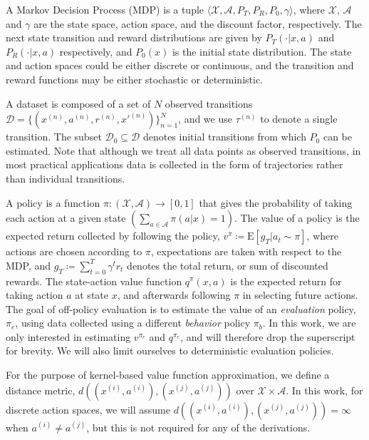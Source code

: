 \documentclass{article}
\begin{document}
A Markov Decision Process (MDP) is a tuple $\langle \mathcal{X}, \mathcal{A}, P_T, P_R, P_0, \gamma \rangle$, where $\mathcal{X}$, $\mathcal{A}$ and $\gamma$ are the state space, action space, and the discount factor, respectively. The next state transition and reward distributions are given by $P_T(\cdot | x, a)$ and $P_R(\cdot | x, a)$ respectively, and $P_0(x)$ is the initial state distribution. The state and action spaces could be either discrete or continuous, and the transition and reward functions may be either stochastic or deterministic. 

A dataset is composed of a set of $N$ observed transitions $\mathcal{D} =  \{ (x^{(n)}, a^{(n)} ,r^{(n)} ,x'^{(n)}) \}_{n=1}^N$, and we use $\tau^{(n)}$ to denote a single transition. The subset $\mathcal{D}_0 \subseteq \mathcal{D}$ denotes initial transitions from which $P_0$ can be estimated. Note that although we treat all data points as observed transitions, in most practical applications data is collected in the form of trajectories rather than individual transitions.

A policy is a function $\pi : (\mathcal{X}, \mathcal{A}) \rightarrow \left[0, 1 \right]$ that gives the probability of taking each action at a given state $(\sum_{a \in \mathcal{A}} \pi(a|x) = 1)$.  The value of a policy is the expected return collected by following the policy, $v^\pi \coloneqq \mathrm{E} [ g_T | a_t \sim \pi]$, where actions are chosen according to $\pi$, expectations are taken with respect to the MDP, and $g_T \coloneqq \sum_{t=0}^T \gamma^t r_t$ denotes the total return, or sum of discounted rewards. The state-action value function $q^{\pi}(x, a)$ is the expected return for taking action $a$ at state $x$, and afterwards following $\pi$ in selecting future actions. The goal of off-policy evaluation is to estimate the value of an \emph{evaluation} policy, $\pi_e$, using data collected using a different \emph{behavior} policy $\pi_b$. In this work, we are only interested in estimating $v^{\pi_e}$ and $q^{\pi_e}$, and will therefore drop the superscript for brevity. We will also limit ourselves to deterministic evaluation policies.

For the purpose of kernel-based value function approximation, we define a distance metric, $d((x^{(i)}, a^{(i)}),(x^{(j)}, a^{(j)}))$ over $\mathcal{X} \times \mathcal{A}$. In this work, for discrete action spaces, we will assume $d((x^{(i)}, a^{(i)}),(x^{(j)}, a^{(j)})) = \infty$ when $a^{(i)} \neq a^{(j)}$, but this is not required for any of the derivations.
\end{document}
